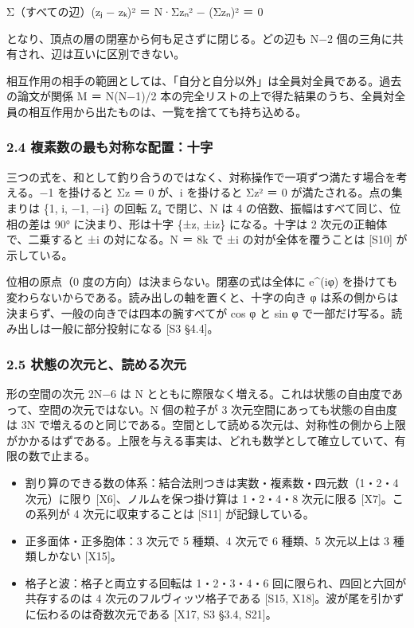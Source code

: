 \documentclass[
  a4paper,
]{ltjsarticle}
\providecommand{\tightlist}{%
  \setlength{\itemsep}{0pt}\setlength{\parskip}{0pt}}
\begin{document}
Σ（すべての辺）(zⱼ − zₖ)² ＝ N·Σzₙ² − (Σzₙ)² ＝ 0

となり、頂点の層の閉塞から何も足さずに閉じる。どの辺も N−2
個の三角に共有され、辺は互いに区別できない。

相互作用の相手の範囲としては、「自分と自分以外」は全員対全員である。過去の論文が関係
M ＝ N(N−1)/2
本の完全リストの上で得た結果のうち、全員対全員の相互作用から出たものは、一覧を捨てても持ち込める。

\subsubsection{2.4
複素数の最も対称な配置：十字}\label{ux8907ux7d20ux6570ux306eux6700ux3082ux5bfeux79f0ux306aux914dux7f6eux5341ux5b57}

三つの式を、和として釣り合うのではなく、対称操作で一項ずつ満たす場合を考える。−1
を掛けると Σz ＝ 0 が、i を掛けると Σz² ＝ 0 が満たされる。点の集まりは
\{1, i, −1, −i\} の回転 Z₄ で閉じ、N は 4
の倍数、振幅はすべて同じ、位相の差は 90° に決まり、形は十字 \{±z, ±iz\}
になる。十字は 2 次元の正軸体で、二乗すると ±i の対になる。N ＝ 8k で ±i
の対が全体を覆うことは {[}S10{]} が示している。

位相の原点（0 度の方向）は決まらない。閉塞の式は全体に e\^{}(iφ)
を掛けても変わらないからである。読み出しの軸を置くと、十字の向き φ
は系の側からは決まらず、一般の向きでは四本の腕すべてが cos φ と sin φ
で一部だけ写る。読み出しは一般に部分投射になる {[}S3 §4.4{]}。

\subsubsection{2.5
状態の次元と、読める次元}\label{ux72b6ux614bux306eux6b21ux5143ux3068ux8aadux3081ux308bux6b21ux5143}

形の空間の次元 2N−6 は N
とともに際限なく増える。これは状態の自由度であって、空間の次元ではない。N
個の粒子が 3 次元空間にあっても状態の自由度は 3N
で増えるのと同じである。空間として読める次元は、対称性の側から上限がかかるはずである。上限を与える事実は、どれも数学として確立していて、有限の数で止まる。

\begin{itemize}
\tightlist
\item
  割り算のできる数の体系：結合法則つきは実数・複素数・四元数（1・2・4
  次元）に限り {[}X6{]}、ノルムを保つ掛け算は 1・2・4・8 次元に限る
  {[}X7{]}。この系列が 4 次元に収束することは {[}S11{]} が記録している。
\item
  正多面体・正多胞体：3 次元で 5 種類、4 次元で 6 種類、5 次元以上は 3
  種類しかない {[}X15{]}。
\item
  格子と波：格子と両立する回転は 1・2・3・4・6
  回に限られ、四回と六回が共存するのは 4 次元のフルヴィッツ格子である
  {[}S15, X18{]}。波が尾を引かずに伝わるのは奇数次元である {[}X17, S3
  §3.4, S21{]}。
\end{itemize}
\end{document}
